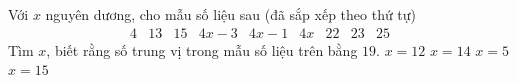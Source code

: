 \begin{ex}%
	Với $x$ nguyên dương, cho mẫu số liệu sau (đã sắp xếp theo thứ tự) 
	 $$
	\begin{array}{lllllllll}
		4 & 13 & 15 & 4 x-3 & 4 x-1  & 4 x & 22 & 23 & 25
	\end{array}
	 $$
	Tìm $x$, biết rằng số trung vị trong mẫu số liệu trên  bằng $19$.
	\choice 
		 {$x=12$}
		 {$x=14$}
		{\True  $x=5$}
		{$x=15$} 
\end{ex}
